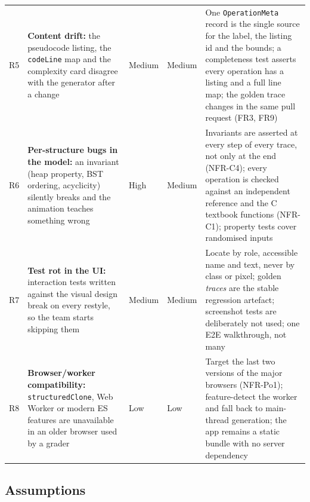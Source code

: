 \documentclass[11pt,a4paper]{article}
\newcommand{\ct}[1]{\texttt{#1}}
\begin{document}
{\begin{longtable}{@{}L{0.8cm}L{3.5cm}L{1.3cm}L{1.3cm}L{6.6cm}@{}}
R5 & \textbf{Content drift:} the pseudocode listing, the \ct{codeLine} map and the complexity
card disagree with the generator after a change & Medium & Medium & One \ct{OperationMeta}
record is the single source for the label, the listing id and the bounds; a completeness test
asserts every operation has a listing and a full line map; the golden trace changes in the same
pull request (FR3, FR9) \\
R6 & \textbf{Per-structure bugs in the model:} an invariant (heap property, BST ordering,
acyclicity) silently breaks and the animation teaches something wrong & High & Medium &
Invariants are asserted at every step of every trace, not only at the end (NFR-C4); every
operation is checked against an independent reference and the C textbook functions (NFR-C1);
property tests cover randomised inputs \\
R7 & \textbf{Test rot in the UI:} interaction tests written against the visual design break on
every restyle, so the team starts skipping them & Medium & Medium & Locate by role, accessible
name and text, never by class or pixel; golden \emph{traces} are the stable regression
artefact; screenshot tests are deliberately not used; one E2E walkthrough, not many \\
R8 & \textbf{Browser/worker compatibility:} \ct{structuredClone}, Web Worker or modern
ES features are unavailable in an older browser used by a grader & Low & Low & Target the last
two versions of the major browsers (NFR-Po1); feature-detect the worker and fall back to
main-thread generation; the app remains a static bundle with no server dependency \\
\end{longtable}
}

\subsection{Assumptions}
\end{document}
